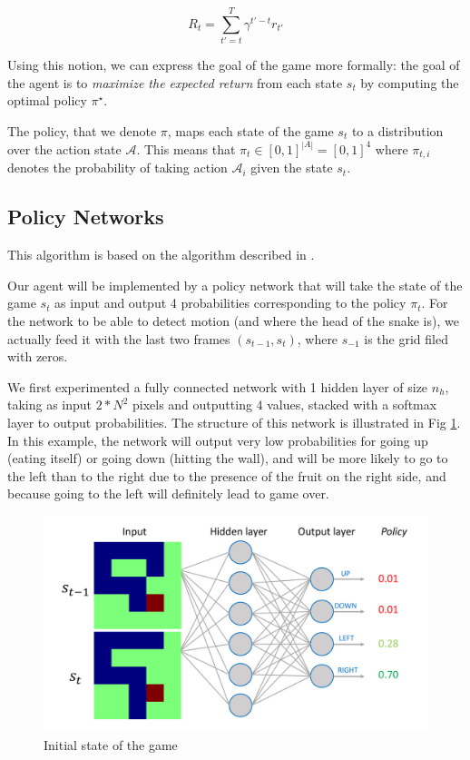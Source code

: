 \documentclass{article}
\begin{document}
\[R_t = \sum_{t' = t}^T \gamma^{t' - t} r_{t'}\]

Using this notion, we can express the goal of the game more formally: the goal of the agent is to \textit{maximize the expected return} from each state $s_t$ by computing the optimal policy $\pi^{\star}$.

The policy, that we denote $\pi$,
maps each state of the game $s_t$ to a distribution over the action state $\mathcal A$. This means that $\pi_t \in [0, 1]^{|A|} = [0, 1]^4$ where $\pi_{t,i}$ denotes the probability of taking action $\mathcal A_i$ given the state $s_t$.

\subsection{Policy Networks}

This algorithm is based on the algorithm described in \cite{mnih2016asynchronous}.

Our agent will be implemented by a policy network that will take the state of the game $s_t$ as input and output 4 probabilities corresponding to the policy $\pi_t$. For the network to be able to detect motion (and where the head of the snake is), we actually feed it with the last two frames $(s_{t-1}, s_t)$, where $s_{-1}$ is the grid filed with zeros.

We first experimented a fully connected network with 1 hidden layer of size $n_h$, taking as input $2 * N^2$ pixels and outputting $4$ values, stacked with a softmax layer to output probabilities. The structure of this network is illustrated in Fig \ref{network}. In this example, the network will output very low probabilities for going up (eating itself) or going down (hitting the wall), and will be more likely to go to the left than to the right due to the presence of the fruit on the right side, and because going to the left will definitely lead to game over.

\begin{figure}[!htpb]
\centering
\includegraphics[width=\linewidth]{layer.pdf}
\caption{Initial state of the game}
\label{network}
\end{figure}
\end{document}
